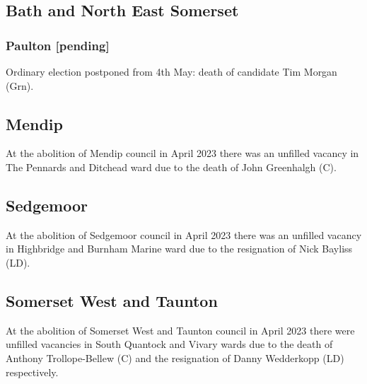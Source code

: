 \documentclass[a4paper,openany]{book}
\begin{document}
\begin{resultsiii}
\subsection*{Bath and North East Somerset}

\subsubsection*{Paulton \hspace*{\fill}\nolinebreak[1]%
	\enspace\hspace*{\fill}
	[pending]}


Ordinary election postponed from 4th May: death of candidate Tim Morgan (Grn).

\subsection*{Mendip}

At the abolition of Mendip council in April 2023 there was an unfilled vacancy in The Pennards and Ditchead ward due to the death of John Greenhalgh (C).%

\subsection*{Sedgemoor}

At the abolition of Sedgemoor council in April 2023 there was an unfilled vacancy in Highbridge and Burnham Marine ward due to the resignation of Nick Bayliss (LD).%

\subsection*{Somerset West and Taunton}

At the abolition of Somerset West and Taunton council in April 2023 there were unfilled vacancies in South Quantock and Vivary wards due to the death of Anthony Trollope-Bellew (C) and the resignation of Danny Wedderkopp (LD) respectively.%
%


\end{resultsiii}
\end{document}
